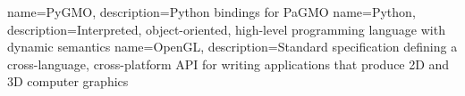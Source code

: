 

{
   name={PyGMO},
   description={Python bindings for PaGMO}
}
{
   name={Python},
   description={Interpreted, object-oriented, high-level programming language with dynamic semantics}
}
{
   name={OpenGL},
   description={Standard specification defining a cross-language, cross-platform API for writing applications that produce 2D and 3D computer graphics}
}


\printglossaries


